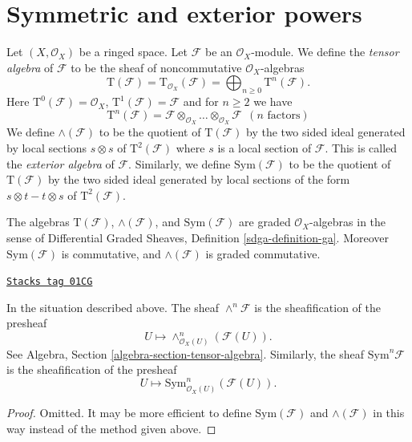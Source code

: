 \section{Symmetric and exterior powers}
\label{modules-section-symmetric-exterior}
Let $(X, \mathcal{O}_X)$ be a ringed space.
Let $\mathcal{F}$ be an $\mathcal{O}_X$-module.
We define the {\it tensor algebra} of $\mathcal{F}$ to be
the sheaf of noncommutative $\mathcal{O}_X$-algebras
$$
\text{T}(\mathcal{F})
=
\text{T}_{\mathcal{O}_X}(\mathcal{F})
= \bigoplus\nolimits_{n \geq 0} \text{T}^n(\mathcal{F}).
$$
Here $\text{T}^0(\mathcal{F}) = \mathcal{O}_X$,
$\text{T}^1(\mathcal{F}) = \mathcal{F}$
and for $n \geq 2$ we have
$$
\text{T}^n(\mathcal{F}) =
\mathcal{F} \otimes_{\mathcal{O}_X} \ldots \otimes_{\mathcal{O}_X} \mathcal{F}
\ \ (n\text{ factors})
$$
We define $\wedge(\mathcal{F})$ to be the quotient of
$\text{T}(\mathcal{F})$ by the two sided ideal generated by
local sections $s \otimes s$ of $\text{T}^2(\mathcal{F})$ where
$s$ is a local section of $\mathcal{F}$. This is
called the {\it exterior algebra} of $\mathcal{F}$.
Similarly, we define $\text{Sym}(\mathcal{F})$ to be
the quotient of $\text{T}(\mathcal{F})$ by the two
sided ideal generated by local sections of the form
$s \otimes t - t \otimes s$ of $\text{T}^2(\mathcal{F})$.

\medskip\noindent
The algebras $\text{T}(\mathcal{F})$, $\wedge(\mathcal{F})$, and
$\text{Sym}(\mathcal{F})$ are graded $\mathcal{O}_X$-algebras
in the sense of Differential Graded Sheaves, Definition
\ref{sdga-definition-ga}.
Moreover $\text{Sym}(\mathcal{F})$
is commutative, and $\wedge(\mathcal{F})$ is graded commutative.

\begin{lemma}
\label{modules-lemma-local-tensor-algebra}
\href{https://stacks.math.columbia.edu/tag/01CG}{\texttt{Stacks tag 01CG}}

In the situation described above.
The sheaf $\wedge^n\mathcal{F}$ is the sheafification of the
presheaf
$$
U \longmapsto \wedge^n_{\mathcal{O}_X(U)}(\mathcal{F}(U)).
$$
See Algebra, Section \ref{algebra-section-tensor-algebra}.
Similarly, the sheaf $\text{Sym}^n\mathcal{F}$ is the sheafification
of the presheaf
$$
U \longmapsto \text{Sym}^n_{\mathcal{O}_X(U)}(\mathcal{F}(U)).
$$
\end{lemma}

\begin{proof}
Omitted. It may be more efficient to define $\text{Sym}(\mathcal{F})$
and $\wedge(\mathcal{F})$ in this way instead of the method
given above.
\end{proof}

